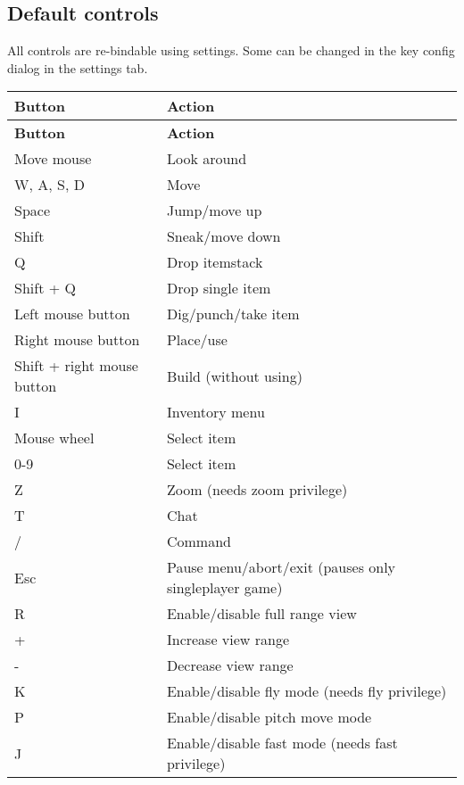 \subsection*{Default controls }

All controls are re-\/bindable using settings. Some can be changed in the key config dialog in the settings tab.

\tabulinesep=1mm
\begin{longtabu} spread 0pt [c]{*{2}{|X[-1]}|}
\hline
\rowcolor{\tableheadbgcolor}\textbf{ Button }&\textbf{ Action  }\\
\endfirsthead
\hline
\endfoot
\hline
\rowcolor{\tableheadbgcolor}\textbf{ Button }&\textbf{ Action  }\\
\endhead
Move mouse &Look around \\
W, A, S, D &Move \\
Space &Jump/move up \\
Shift &Sneak/move down \\
Q &Drop itemstack \\
Shift + Q &Drop single item \\
Left mouse button &Dig/punch/take item \\
Right mouse button &Place/use \\
Shift + right mouse button &Build (without using) \\
I &Inventory menu \\
Mouse wheel &Select item \\
0-\/9 &Select item \\
Z &Zoom (needs zoom privilege) \\
T &Chat \\
/ &Command \\
Esc &Pause menu/abort/exit (pauses only singleplayer game) \\
R &Enable/disable full range view \\
+ &Increase view range \\
-\/ &Decrease view range \\
K &Enable/disable fly mode (needs fly privilege) \\
P &Enable/disable pitch move mode \\
J &Enable/disable fast mode (needs fast privilege) \\

\end{longtabu}
